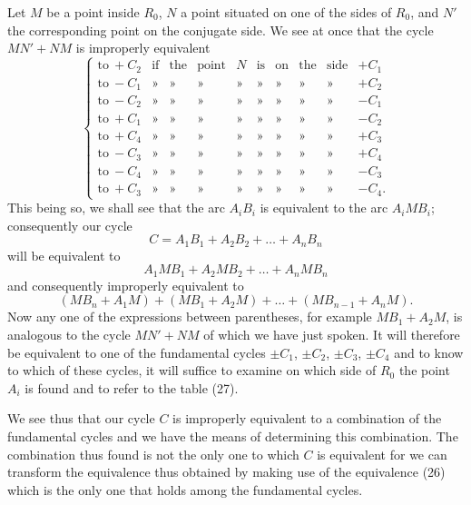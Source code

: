 \documentclass{article}
\begin{document}
Let $M$ be a point inside $R_{0}$, $N$ a point situated on one of the sides of $R_{0}$, and $N'$ the corresponding point on the conjugate side. We see at once that the cycle $MN' + NM$ is improperly equivalent
\[ \left\{ \begin{matrix} \text{to}\ +C_{2} & \text{if} & \text{the} & \text{point} & N & \text{is} & \text{on} & \text{the} & \text{side} & +C_{1} \\ \text{to}\ -C_{1} & \text{»} & \text{»} & \text{»} & \text{»} & \text{»} & \text{»} & \text{»} & \text{»} & +C_{2} \\ \text{to}\ -C_{2} & \text{»} & \text{»} & \text{»} & \text{»} & \text{»} & \text{»} & \text{»} & \text{»} & -C_{1} \\ \text{to}\ +C_{1} & \text{»} & \text{»} & \text{»} & \text{»} & \text{»} & \text{»} & \text{»} & \text{»} & -C_{2} \\ \text{to}\ +C_{4} & \text{»} & \text{»} & \text{»} & \text{»} & \text{»} & \text{»} & \text{»} & \text{»} & +C_{3} \\ \text{to}\ -C_{3} & \text{»} & \text{»} & \text{»} & \text{»} & \text{»} & \text{»} & \text{»} & \text{»} & +C_{4} \\ \text{to}\ -C_{4} & \text{»} & \text{»} & \text{»} & \text{»} & \text{»} & \text{»} & \text{»} & \text{»} & -C_{3} \\ \text{to}\ +C_{3} & \text{»} & \text{»} & \text{»} & \text{»} & \text{»} & \text{»} & \text{»} & \text{»} & -C_{4}. \end{matrix} \right. \tag{27} \]
This being so, we shall see that the arc $A_{i}B_{i}$ is equivalent to the arc $A_{i}MB_{i}$; consequently our cycle
\[ C = A_{1}B_{1} + A_{2}B_{2} + \ldots + A_{n}B_{n} \]
will be equivalent to
\[ A_{1}MB_{1} + A_{2}MB_{2} + \ldots + A_{n}MB_{n} \]
and consequently improperly equivalent to
\[ (MB_{n} + A_{1}M) + (MB_{1} + A_{2}M) + \ldots + (MB_{n-1} + A_{n}M). \]
Now any one of the expressions between parentheses, for example $MB_{1} + A_{2}M$, is analogous to the cycle $MN' + NM$ of which we have just spoken. It will therefore be equivalent to one of the fundamental cycles $\pm C_{1}$, $\pm C_{2}$, $\pm C_{3}$, $\pm C_{4}$ and to know to which of these cycles, it will suffice to examine on which side of $R_{0}$ the point $A_{i}$ is found and to refer to the table (27).


We see thus that our cycle $C$ is improperly equivalent to a combination of the fundamental cycles and we have the means of determining this combination. The combination thus found is not the only one to which $C$ is equivalent for we can transform the equivalence thus obtained by making use of the equivalence (26) which is the only one that holds among the fundamental cycles.
\end{document}
